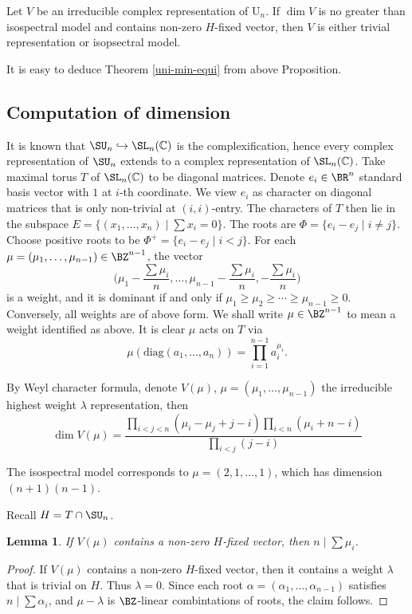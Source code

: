 \documentclass[a4paper]{amsart}
\newcommand{\BC}{{\mathbb {C}}} \newcommand{\BD}{{\mathbb {D}}}
\newcommand{\RU}{{\mathrm {U}}} \newcommand{\RV}{{\mathrm {V}}}
\newcommand{\diag}{{\mathrm{diag}}}
\newcommand{\incl}{\hookrightarrow}
\theoremstyle{plain}
\newtheorem{lem}[thm]{Lemma}
\theoremstyle{remark} \newtheorem{remark}[thm]{Remark}
\theoremstyle{remark} \newtheorem{exercise}{Exercise}
\theoremstyle{remark} \newtheorem{example}{Example}
\numberwithin{equation}{section}
\begin{document}
\begin{prop}\label{H-fix-min}
    Let $V$ be an irreducible complex representation of $\RU_n$. If $\dim V$ is no greater than isospectral model and contains non-zero $H$-fixed vector, then $V$ is either trivial representation or isopsectral model.
\end{prop}

It is easy to deduce Theorem \ref{uni-min-equi} from above Proposition.






\subsection{Computation of dimension}

It is known that $\SU_n\incl\SL_n(\BC)$ is the complexification, hence every complex representation of $\SU_n$ extends to a complex representation of $\SL_n(\BC)$. Take maximal torus $T$ of $\SL_n(\BC)$ to be diagonal matrices. Denote $e_i\in\BR^n$ standard basis vector with $1$ at $i$-th coordinate. We view $e_i$ as character on diagonal matrices that is only non-trivial at $(i,i)$-entry. The characters of $T$ then lie in the subspace $E=\{(x_1,\ldots,x_n)\mid \sum x_i=0\}$. The roots are $\Phi=\{e_i-e_j\mid i\neq j\}$. Choose positive roots to be $\Phi^+=\{e_i-e_j\mid i<j\}$. For each $\mu=(\mu_1,\ldots,\mu_{n-1})\in\BZ^{n-1}$, the vector
\[\Big(\mu_1-\frac{\sum\mu_i}{n},\ldots,\mu_{n-1}-\frac{\sum\mu_i}{n},-\frac{\sum\mu_i}{n}\Big)\]
is a weight, and it is dominant if and only if $\mu_1\geqslant\mu_2\geqslant\cdots\geqslant\mu_{n-1}\geqslant 0$. Conversely, all weights are of above form. We shall write $\mu\in\BZ^{n-1}$ to mean a weight identified as above. It is clear $\mu$ acts on $T$ via
\[\mu(\diag(a_1,\ldots,a_n))=\prod_{i=1}^{n-1}a_i^{\mu_i}.\]

By Weyl character formula, denote $V(\mu)$, $\mu=(\mu_1,\ldots,\mu_{n-1})$ the irreducible highest weight $\lambda$ representation, then
\[\dim V(\mu)=\frac{\prod_{i<j<n}(\mu_i-\mu_j+j-i)\prod_{i<n}(\mu_i+n-i)}{\prod_{i<j}(j-i)}\]

The isospectral model corresponds to $\mu=(2,1,\ldots,1)$, which has dimension $(n+1)(n-1)$.

Recall $H=T\cap\SU_n$.

\begin{lem}\label{n-div}
    If $V(\mu)$ contains a non-zero $H$-fixed vector, then $n\mid\sum\mu_i$.
\end{lem}
\begin{proof}
    If $V(\mu)$ contains a non-zero $H$-fixed vector, then it contains a weight $\lambda$ that is trivial on $H$. Thus $\lambda=0$. Since each root $\alpha=(\alpha_1,\ldots,\alpha_{n-1})$ satisfies $n\mid\sum\alpha_i$, and $\mu-\lambda$ is $\BZ$-linear combintations of roots, the claim follows.
\end{proof}
\end{document}
